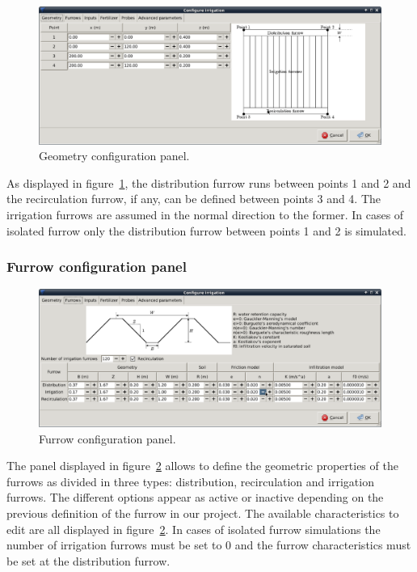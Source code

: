 \documentclass[review,authoryear]{elsarticle}
\begin{document}
\begin{figure}[!ht]
\begin{center}
\includegraphics[width=1125\UNIT]{confGeomEN.eps}
\caption{Geometry configuration panel.}\label{geomWindow}
\end{center}
\end{figure}

As displayed in figure~\ref{geomWindow}, the distribution furrow runs between
points 1 and 2 and the recirculation furrow, if any, can be defined between
points 3 and 4. The irrigation furrows are assumed in the normal direction to
the former. In cases of isolated furrow only the distribution furrow between
points 1 and 2 is simulated.

\subsubsection{Furrow configuration panel}

\begin{figure}[!ht]
\begin{center}
\includegraphics[width=1125\UNIT]{confSurcoEN.eps}
\caption{Furrow configuration panel.}\label{confSurcos}
\end{center}
\end{figure}

The panel displayed in figure~\ref{confSurcos} allows to define the geometric
properties of the furrows as divided in three types: distribution, recirculation
and irrigation furrows. The different options appear as active or inactive
depending on the previous definition of the furrow in our project. The available
characteristics to edit are all displayed in figure~\ref{confSurcos}. In cases
of isolated furrow simulations the number of irrigation furrows must be set to 0
and the furrow characteristics must be set at the distribution furrow.
\end{document}
